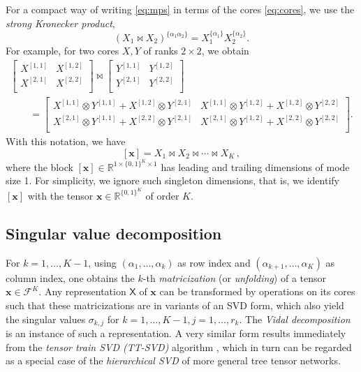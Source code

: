 \documentclass[a4paper,11pt,oneside]{amsart}
\theoremstyle{definition}
\theoremstyle{remark}
\newcommand{\cF}{{\mathcal{F}}}
\newcommand{\R}{\mathbb{R}}
\newcommand{\ten}[1]{\boldsymbol{#1}}
\newcommand{\rep}[1]{\mathsf{#1}}
\DeclareMathOperator*{\SKP}{\Join}
\numberwithin{equation}{section}
\numberwithin{theorem}{section}
\begin{document}
For a compact way of writing \eqref{eq:mps} in terms of the cores \eqref{eq:cores}, we use the \emph{strong Kronecker product}, 
\[
   ( X_1 \SKP X_2 )^{ \{ \alpha_1 \alpha_2 \} } = X_1^{ \{ \alpha_1 \}  }  X_2^{ \{ \alpha_2 \}  }.
\]
For example, for two cores $X, Y$ of ranks $2\times 2$, we obtain
\[
\begin{multlined}
  	\begin{bmatrix}
	X^{[1,1]} & X^{[1,2]}\\
	X^{[2,1]} & X^{[2,2]}\\
	\end{bmatrix}
	\SKP
	\begin{bmatrix}
	Y^{[1,1]} & Y^{[1,2]}\\
	Y^{[2,1]} & Y^{[2,2]}\\
	\end{bmatrix}  \qquad \\
 \qquad	=
	\begin{bmatrix}
	X^{[1,1]} \otimes Y^{[1,1]} + X^{[1,2]} \otimes Y^{[2,1]} & X^{[1,1]} \otimes Y^{[1,2]} + X^{[1,2]} \otimes Y^{[2,2]}\\
	X^{[2,1]} \otimes Y^{[1,1]} + X^{[2,2]} \otimes Y^{[2,1]} & X^{[2,1]} \otimes Y^{[1,2]} + X^{[2,2]} \otimes Y^{[2,2]}\\
	\end{bmatrix}.
	\end{multlined}
\]
With this notation, we have
\[
     [\ten{x}] = X_1 \SKP X_2 \SKP \cdots \SKP X_K\,,
\]
where the block $[\ten{x}] \in \R^{ 1 \times \{0,1\}^K \times 1}$ has leading and trailing dimensions of mode size 1.
For simplicity, we ignore such singleton dimensions, that is,
we identify $[\ten{x}]$ with the tensor $\ten{x} \in \R^{\{0,1\}^K}$ of order $K$. 


\subsection{Singular value decomposition}
For $k=1,\ldots,K-1$, using $(\alpha_1,\ldots,\alpha_k)$ as row index and $(\alpha_{k+1},\ldots, \alpha_K)$ as column index, one obtains the $k$-th \emph{matricization} (or \emph{unfolding}) of a tensor $\ten x \in \cF^K$. Any representation $\rep X$ of $\ten x$ can be transformed by operations on its cores such that these matricizations are in variants of an SVD form, which also yield the singular values $\sigma_{k,j}$ for $k = 1,\ldots,K-1, j = 1,\ldots,r_k$. The \emph{Vidal decomposition} \cite{vidal03} is an instance of such a representation. A very similar form results immediately from the \emph{tensor train SVD (TT-SVD)} algorithm \cite{Oseledets:2011:TT}, which in turn can be regarded as a special case of the \emph{hierarchical SVD} \cite{Grasedyck:2010:HierarchicalSVD} of more general tree tensor networks.
\end{document}
